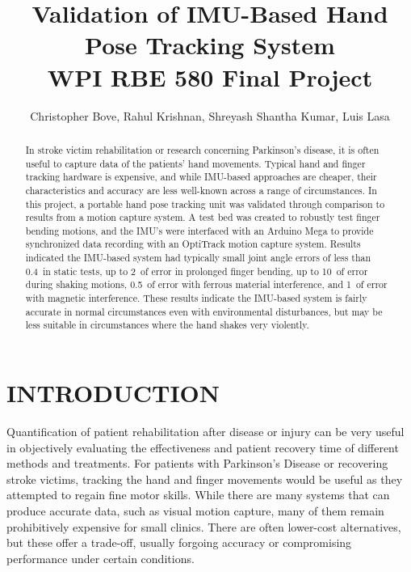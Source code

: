 \documentclass[letterpaper, 10 pt, conference]{ieeeconf}  %
\title{\LARGE \bf
Validation of IMU-Based Hand Pose Tracking System \\ WPI RBE 580 Final Project
}
\author{Christopher Bove, Rahul Krishnan, Shreyash Shantha Kumar, Luis Lasa}
\begin{document}
\maketitle
\thispagestyle{empty}
\pagestyle{empty}


\begin{abstract}
In stroke victim rehabilitation or research concerning Parkinson's disease, it is often useful to capture data of the patients' hand movements. Typical hand and finger tracking hardware is expensive, and while IMU-based approaches are cheaper, their characteristics and accuracy are less well-known across a range of circumstances. In this project, a portable hand pose tracking unit was validated through comparison to results from a motion capture system. A test bed was created to robustly test finger bending motions, and the IMU's were interfaced with an Arduino Mega to provide synchronized data recording with an OptiTrack motion capture system. Results indicated the IMU-based system had typically small joint angle errors of less than 0.4\degree\ in static tests, up to 2\degree\ of error in prolonged finger bending, up to 10\degree\ of error during shaking motions, 0.5\degree\ of error with ferrous material interference, and 1\degree\ of error with magnetic interference. These results indicate the IMU-based system is fairly accurate in normal circumstances even with environmental disturbances, but may be less suitable in circumstances where the hand shakes very violently.
\end{abstract}

\section{INTRODUCTION}
Quantification of patient rehabilitation after disease or injury can be very useful in objectively evaluating the effectiveness and patient recovery time of different methods and treatments. For patients with Parkinson's Disease or recovering stroke victims, tracking the hand and finger movements would be useful as they attempted to regain fine motor skills. While there are many systems that can produce accurate data, such as visual motion capture, many of them remain prohibitively expensive for small clinics. There are often lower-cost alternatives, but these offer a trade-off, usually forgoing accuracy or compromising performance under certain conditions. 
\end{document}
